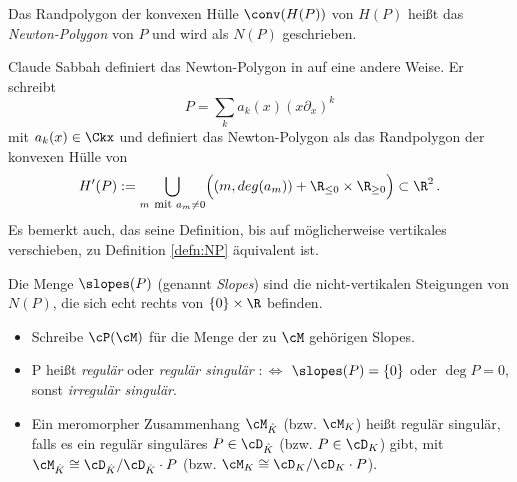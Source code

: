 \begin{defn} \label{defn:NP}
Das Randpolygon der konvexen Hülle $\conv(H(P))$ von $H(P)$ heißt das
\emph{Newton-Polygon} von $P$ und wird als $N(P)$ geschrieben.
\end{defn}

\begin{bem}
Claude Sabbah definiert das Newton-Polygon in \cite[5.1]{sabbah_cimpa90}
auf eine andere Weise. Er schreibt
\[
P=\sum_ka_k(x)(x\partial_x)^k
\]
mit $a_k(x)\in \Ckx$ und definiert das Newton-Polygon als das
Randpolygon der konvexen Hülle von
\[
H'(P):=\underset{m\mbox{ \footnotesize mit }a_{m}\neq0}{\bigcup}
  \Big( (m,deg(a_m)) + \R_{\leq 0}\times \R_{\geq 0} \Big) \subset \R^2 \,.
\]
Es bemerkt auch, das seine Definition, bis auf möglicherweise vertikales
verschieben, zu Definition \ref{defn:NP} äquivalent ist.
\end{bem}

\begin{defn} %
Die Menge $\slopes(P)$ (genannt \emph{Slopes}) sind die nicht-vertikalen
Steigungen von $N(P)$, die sich echt rechts von $\{0\}\times\R$ befinden.
\begin{itemize}
\item Schreibe $\cP(\cM)$ für die Menge der zu $\cM$ gehörigen Slopes.
\item P heißt \emph{regulär} oder \emph{regulär singulär} $:\Leftrightarrow$
$\slopes(P)=\{0\}$ oder $\deg P=0$, sonst \emph{irregulär singulär}.
\item Ein meromorpher Zusammenhang $\cM_{\hat K}$ (bzw. $\cM_K$) heißt regulär
singulär, falls es ein regulär singuläres $P\in \cD_{\hat K}$ (bzw. $P\in
\cD_K$) gibt, mit $\cM_{\hat K}\cong\cD_{\hat K}/\cD_{\hat K}\cdot P$ (bzw.
$\cM_K\cong\cD_K/\cD_K\cdot P$).
\end{itemize}
\end{defn}


